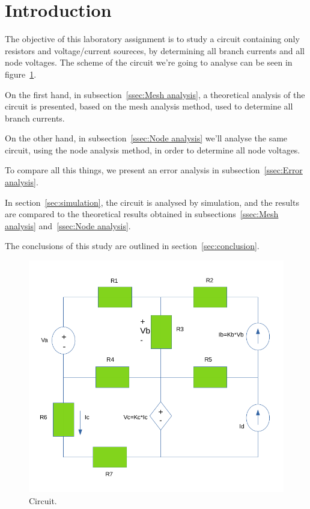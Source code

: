 \section{Introduction}
\label{sec:introduction}

The objective of this laboratory assignment is to study a circuit containing only resistors and voltage/current soureces, by determining all branch currents and all node voltages.
The scheme of the circuit we're going to analyse can be seen in figure~\ref{fig:Cir}.
\par \noindent On the first hand, in subsection~\ref{ssec:Mesh analysis}, a theoretical analysis of the circuit is
presented, based on the mesh analysis method, used to determine all branch currents. 
\par \noindent On the other hand, in subsection~\ref{ssec:Node analysis} we'll analyse the same circuit, using the node analysis method, in order to determine all node voltages.
\par \noindent To compare all this things, we present an error analysis in subsection~\ref{ssec:Error analysis}.
\par \noindent In section~\ref{sec:simulation}, the circuit is analysed by simulation, and the results are compared to the theoretical results obtained in
subsections~\ref{ssec:Mesh analysis} and~\ref{ssec:Node analysis}. 
\par \noindent The conclusions of this study are outlined in section~\ref{sec:conclusion}.

\begin{figure}[h] \centering
\includegraphics[width=0.4\linewidth]{Esquema_intro.png}
\caption{Circuit.}
\label{fig:Cir}
\end{figure}

